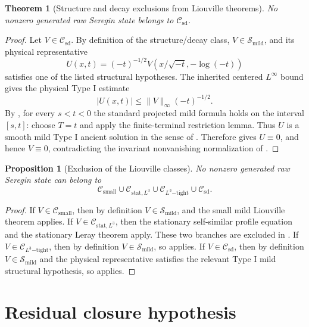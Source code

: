 \documentclass[11pt]{amsart}
\theoremstyle{plain}
\newtheorem{theorem}{Theorem}[section]
\newtheorem{proposition}[proposition]{Proposition}
\theoremstyle{definition}
\theoremstyle{remark}
\numberwithin{equation}{section}
\newcommand{\calS}{\mathcal S}
\newcommand{\calC}{\mathcal C}
\begin{document}
\begin{theorem}[Structure and decay exclusions from Liouville theorems]
\label{p1:thm:known-structure-decay-liouville}
No nonzero generated raw Seregin state belongs to
\(\calC_{\mathrm{sd}}\).
\end{theorem}

\begin{proof}
Let \(V\in\calC_{\mathrm{sd}}\).  By definition of the structure/decay class,
\(V\in\calS_{\mathrm{mild}}\), and its physical representative
\[
   U(x,t)=(-t)^{-1/2}V(x/\sqrt{-t},-\log(-t))
\]
satisfies one of the listed structural hypotheses.  The inherited centered
\(L^\infty\) bound gives the physical Type I estimate
\[
   |U(x,t)|\le \|V\|_\infty(-t)^{-1/2}.
\]
By , for every \(s<t<0\) the standard projected
mild formula holds on the interval \([s,t]\): choose \(T=t\) and apply the
finite-terminal restriction lemma.  Thus \(U\) is a smooth mild Type I ancient
solution in the sense of .  Therefore
 gives \(U\equiv0\), and hence
\(V\equiv0\), contradicting the invariant nonvanishing normalization of
.
\end{proof}

\begin{proposition}[Exclusion of the Liouville classes]
\label{p1:prop:known-class-exclusion}
No nonzero generated raw Seregin state can belong to
\[
   \calC_{\mathrm{small}}
   \cup
   \calC_{\mathrm{stat},L^3}
   \cup
   \calC_{L^3\mathrm{-tight}}
   \cup
   \calC_{\mathrm{sd}}.
\]
\end{proposition}

\begin{proof}
If \(V\in\calC_{\mathrm{small}}\), then by definition
\(V\in\calS_{\mathrm{mild}}\), and the small mild Liouville theorem applies.
If \(V\in\calC_{\mathrm{stat},L^3}\), then the stationary self-similar profile
equation and the stationary Leray theorem apply.  These two branches are
excluded in .  If
\(V\in\calC_{L^3\mathrm{-tight}}\), then by definition
\(V\in\calS_{\mathrm{mild}}\), so  applies.  If
\(V\in\calC_{\mathrm{sd}}\), then by definition \(V\in\calS_{\mathrm{mild}}\)
and the physical representative satisfies the relevant Type I mild structural
hypothesis, so  applies.
\end{proof}

\section{Residual closure hypothesis}\label{p1:sec:criterion}
\end{document}
